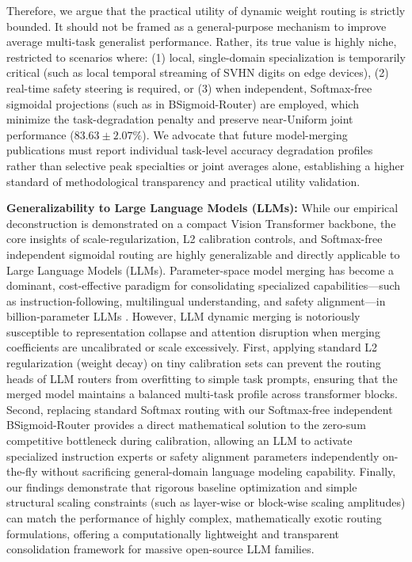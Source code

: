 Therefore, we argue that the practical utility of dynamic weight routing is strictly bounded. It should not be framed as a general-purpose mechanism to improve average multi-task generalist performance. Rather, its true value is highly niche, restricted to scenarios where: (1) local, single-domain specialization is temporarily critical (such as local temporal streaming of SVHN digits on edge devices), (2) real-time safety steering is required, or (3) when independent, Softmax-free sigmoidal projections (such as in BSigmoid-Router) are employed, which minimize the task-degradation penalty and preserve near-Uniform joint performance ($83.63 \pm 2.07\%$). We advocate that future model-merging publications must report individual task-level accuracy degradation profiles rather than selective peak specialties or joint averages alone, establishing a higher standard of methodological transparency and practical utility validation.

\textbf{Generalizability to Large Language Models (LLMs):} While our empirical deconstruction is demonstrated on a compact Vision Transformer backbone, the core insights of scale-regularization, L2 calibration controls, and Softmax-free independent sigmoidal routing are highly generalizable and directly applicable to Large Language Models (LLMs). Parameter-space model merging has become a dominant, cost-effective paradigm for consolidating specialized capabilities---such as instruction-following, multilingual understanding, and safety alignment---in billion-parameter LLMs \cite{task_arithmetic, ties_merging}. However, LLM dynamic merging is notoriously susceptible to representation collapse and attention disruption when merging coefficients are uncalibrated or scale excessively.
First, applying standard L2 regularization (weight decay) on tiny calibration sets can prevent the routing heads of LLM routers from overfitting to simple task prompts, ensuring that the merged model maintains a balanced multi-task profile across transformer blocks.
Second, replacing standard Softmax routing with our Softmax-free independent BSigmoid-Router provides a direct mathematical solution to the zero-sum competitive bottleneck during calibration, allowing an LLM to activate specialized instruction experts or safety alignment parameters independently on-the-fly without sacrificing general-domain language modeling capability. 
Finally, our findings demonstrate that rigorous baseline optimization and simple structural scaling constraints (such as layer-wise or block-wise scaling amplitudes) can match the performance of highly complex, mathematically exotic routing formulations, offering a computationally lightweight and transparent consolidation framework for massive open-source LLM families.

